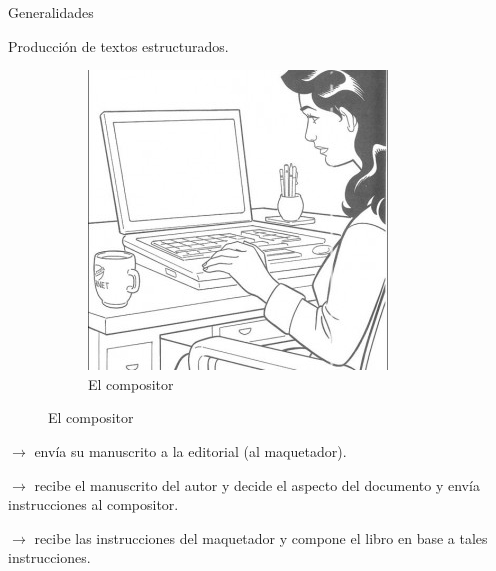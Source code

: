 \begin{frame}{Generalidades}
\begin{block}{Producci\'on de textos estructurados.}
\begin{multicols}{2}
\begin{figure}
                \vspace*{.25cm}				

                \begin{subfigure}[b]{0.5\textwidth} 
                    \centering
                    \includegraphics[scale=.12]{images/compositor}
                    \caption{El compositor}
                \end{subfigure}
            \end{figure}	
            \newpage

            \vspace*{.50cm}
            $\rightarrow$ env\'ia su manuscrito a la editorial (al maquetador). 

            \vspace*{.70cm}
            $\rightarrow$ recibe el manuscrito del autor y decide el aspecto del documento y env\'ia instrucciones al compositor.

            \vspace*{.50cm}
            $\rightarrow$ recibe las instrucciones del maquetador y compone el libro en base a tales instrucciones.
        \end{multicols}
    \end{block}
\end{frame}

